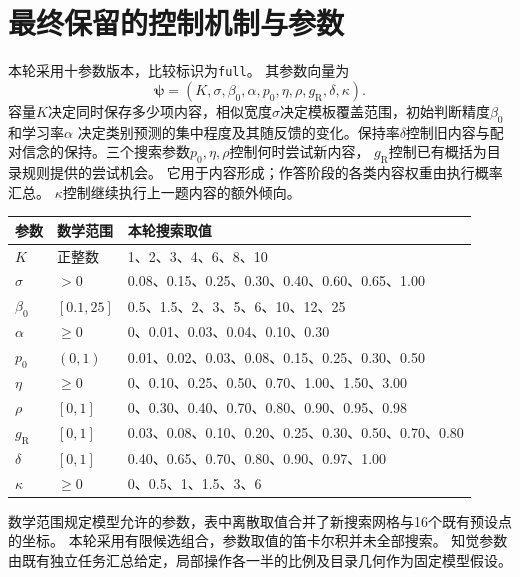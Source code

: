 \documentclass[11pt,a4paper]{article}
\numberwithin{equation}{section}
\begin{document}
\section{最终保留的控制机制与参数}
\label{sec:selected}
本轮采用十参数版本，比较标识为\texttt{full}。
其参数向量为
\begin{equation}
\boldsymbol\psi=(K,\sigma,\beta_0,\alpha,p_0,\eta,\rho,g_{\mathrm R},\delta,\kappa).
\label{eq:parameters}
\end{equation}
容量$K$决定同时保存多少项内容，相似宽度$\sigma$决定模板覆盖范围，初始判断精度$\beta_0$和学习率$\alpha$
决定类别预测的集中程度及其随反馈的变化。保持率$\delta$控制旧内容与配对信念的保持。三个搜索参数$p_0,\eta,\rho$控制何时尝试新内容，
$g_{\mathrm R}$控制已有概括为目录规则提供的尝试机会。
它用于内容形成；作答阶段的各类内容权重由执行概率汇总。
$\kappa$控制继续执行上一题内容的额外倾向。

\begin{center}
\begin{tabularx}{\textwidth}{p{1.2cm}p{2.3cm}Y}
\toprule
参数 & 数学范围 & 本轮搜索取值\\
\midrule
$K$ & 正整数 & 1、2、3、4、6、8、10\\
$\sigma$ & $>0$ & 0.08、0.15、0.25、0.30、0.40、0.60、0.65、1.00\\
$\beta_0$ & $[0.1,25]$ & 0.5、1.5、2、3、5、6、10、12、25\\
$\alpha$ & $\geq0$ & 0、0.01、0.03、0.04、0.10、0.30\\
$p_0$ & $(0,1)$ & 0.01、0.02、0.03、0.08、0.15、0.25、0.30、0.50\\
$\eta$ & $\geq0$ & 0、0.10、0.25、0.50、0.70、1.00、1.50、3.00\\
$\rho$ & $[0,1]$ & 0、0.30、0.40、0.70、0.80、0.90、0.95、0.98\\
$g_{\mathrm R}$ & $[0,1]$ & 0.03、0.08、0.10、0.20、0.25、0.30、0.50、0.70、0.80\\
$\delta$ & $[0,1]$ & 0.40、0.65、0.70、0.80、0.90、0.97、1.00\\
$\kappa$ & $\geq0$ & 0、0.5、1、1.5、3、6\\
\bottomrule
\end{tabularx}
\end{center}
数学范围规定模型允许的参数，表中离散取值合并了新搜索网格与16个既有预设点的坐标。
本轮采用有限候选组合，参数取值的笛卡尔积并未全部搜索。
知觉参数由既有独立任务汇总给定，局部操作各一半的比例及目录几何作为固定模型假设。
\end{document}
